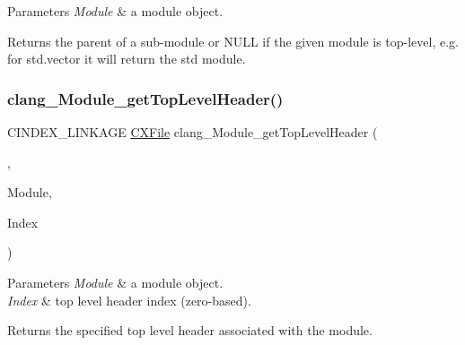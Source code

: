 \begin{DoxyParams}{Parameters}
{\em Module} & a module object.\\
\hline
\end{DoxyParams}
\begin{DoxyReturn}{Returns}
the parent of a sub-\/module or N\+U\+LL if the given module is top-\/level, e.\+g. for \textquotesingle{}std.\+vector\textquotesingle{} it will return the \textquotesingle{}std\textquotesingle{} module. 
\end{DoxyReturn}
\mbox{\label{group__CINDEX__MODULE_ga08aa0746251ca2e8eee69c8fe7c15e2b}} 
\subsubsection{\texorpdfstring{clang\+\_\+\+Module\+\_\+get\+Top\+Level\+Header()}{clang\_Module\_getTopLevelHeader()}}
{\footnotesize\ttfamily C\+I\+N\+D\+E\+X\+\_\+\+L\+I\+N\+K\+A\+GE \hyperlink{group__CINDEX__FILES_gacfcea9c1239c916597e2e5b3e109215a}{C\+X\+File} clang\+\_\+\+Module\+\_\+get\+Top\+Level\+Header (\begin{DoxyParamCaption}\item[{\hyperlink{group__CINDEX_gacdb7815736ca709ce9a5e1ec2b7e16ac}{C\+X\+Translation\+Unit}}]{,  }\item[{C\+X\+Module}]{Module,  }\item[{unsigned}]{Index }\end{DoxyParamCaption})}


\begin{DoxyParams}{Parameters}
{\em Module} & a module object.\\
\hline
{\em Index} & top level header index (zero-\/based).\\
\hline
\end{DoxyParams}
\begin{DoxyReturn}{Returns}
the specified top level header associated with the module. 
\end{DoxyReturn}
\mbox{\label{group__CINDEX__MODULE_ga1e4ad74c404b5f3bcd30cec4dc12fa34}} 
